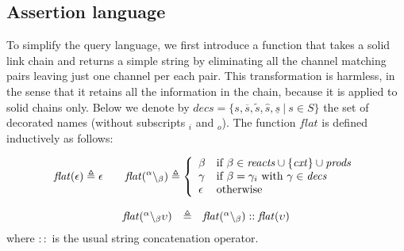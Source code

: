 \subsection{Assertion language}

To simplify the query language, we first introduce a function that takes a solid link chain and returns a simple string by eliminating all the channel matching pairs leaving just one channel per each pair. This transformation is harmless, in the sense that it retains all the information in the chain, because it is applied to solid chains only. Below we denote by $\mathit{decs} = \{ s, \overline{s}, \widetilde{s},\widehat{s},\underline{s}~|~ s\in S\}$ the set of decorated names (without subscripts $_i$ and $_o$).
The function $\mathit{flat}$ is defined inductively as follows:

\[
\mathit{flat}(\epsilon)\triangleq \epsilon 
\qquad
\mathit{flat}({}^{\alpha} \backslash_{\beta}) \triangleq 
\left \{ \begin{array}{ll} 
\beta & \mbox{if $\beta\in \mathit{reacts}\cup\{\mathit{cxt}\}\cup\mathit{prods}$}\\
\gamma & \mbox{if $\beta=\gamma_i$ with $\gamma\in\mathit{decs}$}\\
\epsilon & \mbox{otherwise}  
\end{array} \right. 
\]

\[
\begin{array}{lcl}
\mathit{flat}({}^{\alpha} \backslash_{\beta}\upsilon)& \triangleq & \mathit{flat}({}^{\alpha} \backslash_{\beta}):: \mathit{flat}(\upsilon)\\
\end{array}\\
\]
where  $::$ is the usual string concatenation operator.



